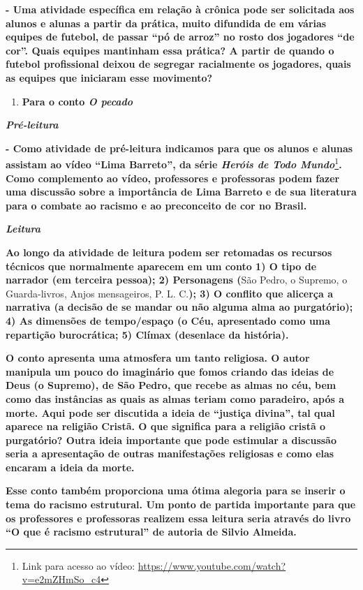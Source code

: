 \textbf{- Uma atividade específica em relação à crônica pode ser
solicitada aos alunos e alunas a partir da prática, muito difundida de
em várias equipes de futebol, de passar ``pó de arroz'' no rosto dos
jogadores ``de cor''. Quais equipes mantinham essa prática? A partir de
quando o futebol profissional deixou de segregar racialmente os
jogadores, quais as equipes que iniciaram esse movimento? }

\begin{enumerate}
\def\labelenumi{\arabic{enumi})}
\setcounter{enumi}{1}
\item
  \textbf{Para o conto \emph{O pecado}}
\end{enumerate}

\emph{\textbf{Pré-leitura}}

\textbf{- Como atividade de pré-leitura indicamos para que os alunos e
alunas assistam ao vídeo ``Lima Barreto'', da série \emph{Heróis de Todo
Mundo}}\footnote{Link para acesso ao vídeo:
  \url{https://www.youtube.com/watch?v=e2mZHmSo_c4}}\textbf{. Como
complemento ao vídeo, professores e professoras podem fazer uma
discussão sobre a importância de Lima Barreto e de sua literatura para o
combate ao racismo e ao preconceito de cor no Brasil. }

\emph{\textbf{Leitura}}

\textbf{Ao longo da atividade de leitura podem ser retomadas os recursos
técnicos que normalmente aparecem em um conto 1) O tipo de narrador (em
terceira pessoa); 2) Personagens (}São Pedro, o Supremo, o
Guarda-livros, Anjos mensageiros, P. L. C.\textbf{); 3) O conflito que
alicerça a narrativa (a decisão de se mandar ou não alguma alma ao
purgatório); 4) As dimensões de tempo/espaço (o Céu, apresentado como
uma repartição burocrática; 5) Clímax (desenlace da história). }

\textbf{O conto apresenta uma atmosfera um tanto religiosa. O autor
manipula um pouco do imaginário que fomos criando das ideias de Deus (o
Supremo), de São Pedro, que recebe as almas no céu, bem como das
instâncias as quais as almas teriam como paradeiro, após a morte. Aqui
pode ser discutida a ideia de ``justiça divina'', tal qual aparece na
religião Cristã. O que significa para a religião cristã o purgatório?
Outra ideia importante que pode estimular a discussão seria a
apresentação de outras manifestações religiosas e como elas encaram a
ideia da morte. }

\textbf{Esse conto também proporciona uma ótima alegoria para se inserir
o tema do racismo estrutural. Um ponto de partida importante para que os
professores e professoras realizem essa leitura seria através do livro
``O que é racismo estrutural'' de autoria de Silvio Almeida. }

